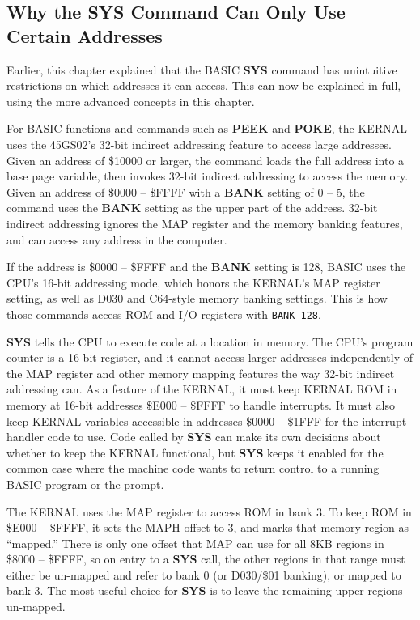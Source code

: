 \subsection{Why the SYS Command Can Only Use Certain Addresses}

Earlier, this chapter explained that the BASIC {\bf SYS} command has
unintuitive restrictions on which addresses it can access. This can now be
explained in full, using the more advanced concepts in this chapter.

For BASIC functions and commands such as {\bf PEEK} and {\bf POKE}, the KERNAL
uses the 45GS02's 32-bit indirect addressing feature to access large
addresses. Given an address of \$10000 or larger, the command loads the full
address into a base page variable, then invokes 32-bit indirect addressing to
access the memory. Given an address of \$0000 -- \$FFFF with a {\bf BANK}
setting of 0 -- 5, the command uses the {\bf BANK} setting as the upper part
of the address. 32-bit indirect addressing ignores the MAP register and the
memory banking features, and can access any address in the computer.

If the address is \$0000 -- \$FFFF and the {\bf BANK} setting is 128, BASIC
uses the CPU's 16-bit addressing mode, which honors the KERNAL's MAP register
setting, as well as D030 and C64-style memory banking settings. This is how
those commands access ROM and I/O registers with \texttt{BANK 128}.

{\bf SYS} tells the CPU to execute code at a location in memory. The CPU's
program counter is a 16-bit register, and it cannot access larger addresses
independently of the MAP register and other memory mapping features the way
32-bit indirect addressing can. As a feature of the KERNAL, it must keep
KERNAL ROM in memory at 16-bit addresses \$E000 -- \$FFFF to handle
interrupts. It must also keep KERNAL variables accessible in addresses \$0000
-- \$1FFF for the interrupt handler code to use. Code called by {\bf SYS} can
make its own decisions about whether to keep the KERNAL functional, but {\bf
SYS} keeps it enabled for the common case where the machine code wants to
return control to a running BASIC program or the  prompt.

The KERNAL uses the MAP register to access ROM in bank 3. To keep ROM in
\$E000 -- \$FFFF, it sets the MAPH offset to 3, and marks that memory region
as ``mapped.'' There is only one offset that MAP can use for all 8KB regions in
\$8000 -- \$FFFF, so on entry to a {\bf SYS} call, the other regions in that
range must either be un-mapped and refer to bank 0 (or D030/\$01 banking), or
mapped to bank 3. The most useful choice for {\bf SYS} is to leave the
remaining upper regions un-mapped.

